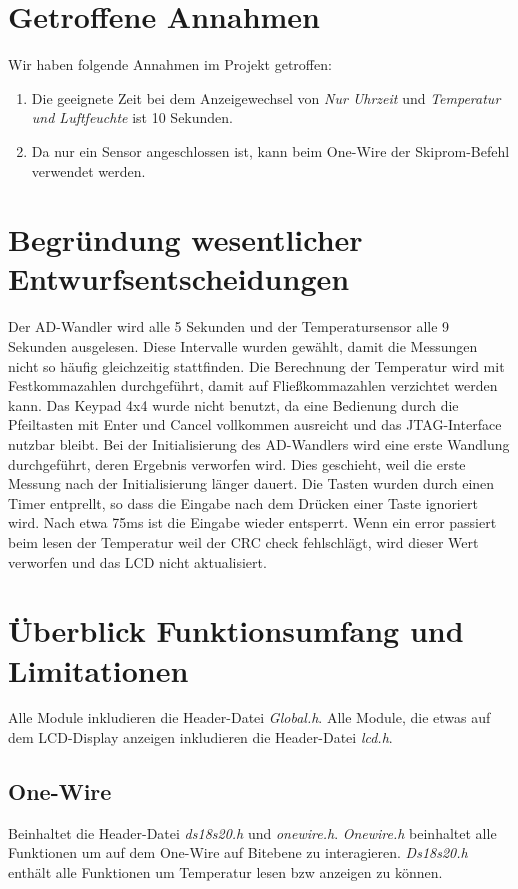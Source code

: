 \documentclass[10pt]{scrartcl}
\begin{document}
\section{Getroffene Annahmen}
Wir haben folgende Annahmen im Projekt getroffen:
\begin{enumerate}
\item Die geeignete Zeit bei dem Anzeigewechsel von \textit{Nur Uhrzeit} und \textit{Temperatur und Luftfeuchte} ist 10 Sekunden.
\item Da nur ein Sensor angeschlossen ist, kann beim One-Wire der Skiprom-Befehl verwendet werden.
\end{enumerate}
\section{Begründung wesentlicher Entwurfsentscheidungen}
Der AD-Wandler wird alle 5 Sekunden und der Temperatursensor alle 9 Sekunden ausgelesen. Diese Intervalle wurden gewählt, damit die Messungen nicht so häufig gleichzeitig stattfinden. Die Berechnung der Temperatur wird mit Festkommazahlen durchgeführt, damit auf Fließkommazahlen verzichtet werden kann. Das Keypad 4x4 wurde nicht benutzt, da eine Bedienung durch die Pfeiltasten mit Enter und Cancel vollkommen ausreicht und das JTAG-Interface nutzbar bleibt. Bei der Initialisierung des AD-Wandlers wird eine erste Wandlung durchgeführt, deren Ergebnis verworfen wird. Dies geschieht, weil die erste Messung nach der Initialisierung länger dauert. Die Tasten wurden durch einen Timer entprellt, so dass die Eingabe nach dem Drücken einer Taste ignoriert wird. Nach etwa 75ms ist die Eingabe wieder entsperrt. Wenn ein error passiert beim lesen der Temperatur weil der CRC check fehlschlägt, wird dieser Wert verworfen und das LCD nicht aktualisiert.
\section{Überblick Funktionsumfang und Limitationen}
Alle Module inkludieren die Header-Datei \textit{Global.h}. Alle Module, die etwas auf dem LCD-Display anzeigen inkludieren die Header-Datei \textit{lcd.h}.
\subsection{One-Wire}
Beinhaltet die Header-Datei \textit{ds18s20.h} und \textit{onewire.h}. \textit{Onewire.h} beinhaltet alle Funktionen um auf dem One-Wire auf Bitebene zu interagieren. \textit{Ds18s20.h} enthält alle Funktionen um Temperatur lesen bzw anzeigen zu können.
\end{document}
